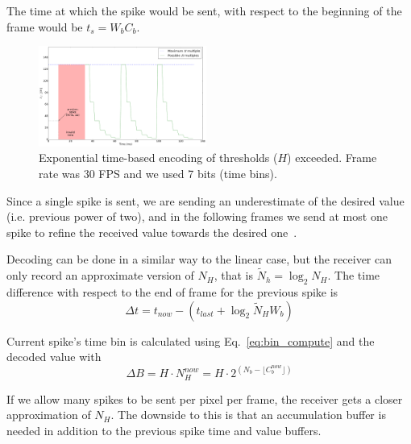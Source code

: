 \documentclass[conference]{IEEEtran}
\begin{document}
The time at which the spike would be sent, with respect to the beginning of the frame would be $t_{s} = W_{b}C_{b}$.
\begin{figure}[htb]
  \centering
  \includegraphics[width=0.49\textwidth]{spike_values_exp}

  \caption{Exponential time-based encoding of thresholds ($H$) exceeded. Frame rate was 30 FPS and we used 7 bits (time bins). }
  \label{fig:exponential_time}
\end{figure} 

Since a single spike is sent, we are sending an underestimate of the desired value (i.e. previous power of two), and in the following frames we send at most one spike to refine the received value towards the desired one~\cite{sardac}. 

Decoding can be done in a similar way to the linear case, but the receiver can only record an approximate version of $N_{H}$, that is $\tilde{N}_{h} = \log_2 N_{H}$. The time difference with respect to the end of frame for the previous spike is
\begin{equation}
\Delta t = t_{now} - \left( t_{last} + \log_{2}\tilde{N}_{H}W_{b} \right)
\label{eq:time_diff_exp}
\end{equation}

Current spike's time bin is calculated using Eq.~\ref{eq:bin_compute} and the decoded value with
\begin{equation}
\Delta B = H\cdot N_{H}^{now} = H\cdot 2^{ \left( N_{b} - \lfloor C^{now}_{b}\rfloor  \right)}
\label{eq:new_Nh_exp}
\end{equation}

If we allow many spikes to be sent per pixel per frame, the receiver gets a closer approximation of $N_{H}$. The downside to this is that an accumulation buffer is needed in addition to the previous spike time and value buffers.
\end{document}
